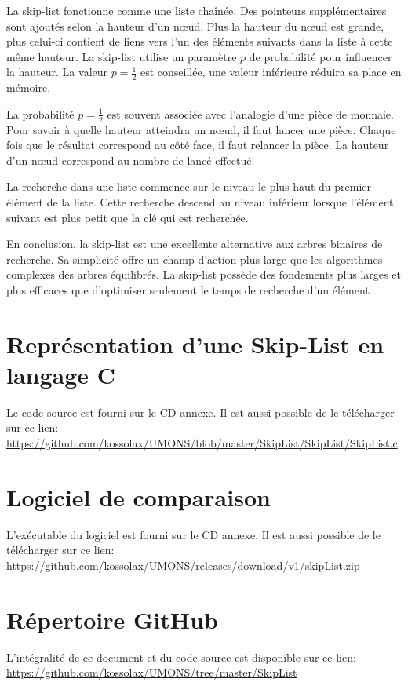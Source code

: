 \documentclass[hidelinks,a4paper, 12pt]{article}
\begin{document}
	La skip-list fonctionne comme une liste chaînée. Des pointeurs supplémentaires sont ajoutés selon la hauteur d'un nœud. Plus la hauteur du nœud est grande, plus celui-ci contient de liens vers l'un des éléments suivants dans la liste à cette même hauteur. La skip-list utilise un paramètre $p$ de probabilité pour influencer la hauteur. La valeur $p=\frac{1}{2}$ est conseillée, une valeur inférieure réduira sa place en mémoire.
	
	La probabilité $p=\frac{1}{2}$ est souvent associée avec l'analogie d'une pièce de monnaie. Pour savoir à quelle hauteur atteindra un nœud, il faut lancer une pièce. Chaque fois que le résultat correspond au côté face, il faut relancer la pièce. La hauteur d'un nœud correspond au nombre de lancé effectué.
	
	La recherche dans une liste commence sur le niveau le plus haut du premier élément de la liste. Cette recherche descend au niveau inférieur lorsque l'élément suivant est plus petit que la clé qui est recherchée.
	
	\vspace{1cm}
	En conclusion, la skip-list est une excellente alternative aux arbres binaires de recherche. Sa simplicité offre un champ d'action plus large que les algorithmes complexes des arbres équilibrés. La skip-list possède des fondements plus larges et plus efficaces que d'optimiser seulement le temps de recherche d'un élément.
	
	\nocite{1}
	\nocite{2}
	\nocite{3}
	\nocite{4}
	\nocite{5}
	\nocite{6}
	\nocite{7}
	
	
	
	\newpage
	\begin{appendices}
	\section{Représentation d'une Skip-List en langage C}
	Le code source est fourni sur le CD annexe. Il est aussi possible de le télécharger sur ce lien:
	\url{https://github.com/kossolax/UMONS/blob/master/SkipList/SkipList/SkipList.c}
	
	\section{Logiciel de comparaison}
	L'exécutable du logiciel est fourni sur le CD annexe. Il est aussi possible de le télécharger sur ce lien:
	\url{https://github.com/kossolax/UMONS/releases/download/v1/skipList.zip}
	
	\section{Répertoire GitHub}
	L'intégralité de ce document et du code source est disponible sur ce lien:
	\url{https://github.com/kossolax/UMONS/tree/master/SkipList}
	
	\end{appendices}
	
\end{document}
